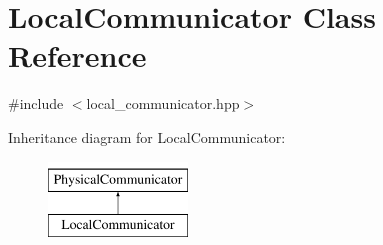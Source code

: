 \hypertarget{classLocalCommunicator}{}\section{Local\+Communicator Class Reference}
\label{classLocalCommunicator}


{\ttfamily \#include $<$local\+\_\+communicator.\+hpp$>$}

Inheritance diagram for Local\+Communicator\+:\begin{figure}[H]
\begin{center}
\leavevmode
\includegraphics[height=2.000000cm]{classLocalCommunicator}
\end{center}
\end{figure}
